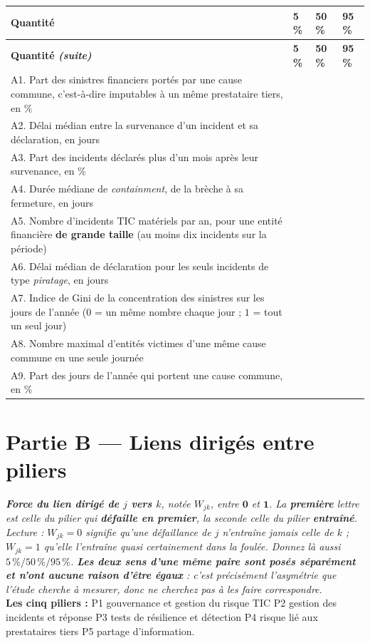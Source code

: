 \documentclass[11pt,a4paper]{article}
\begin{document}
\vspace{0.2cm}
\begin{longtable}{|p{9.6cm}|A|A|A|}
\hline
{}
\textbf{Quantité} & \textbf{5\,\%} & \textbf{50\,\%} & \textbf{95\,\%} \\ \hline
\endfirsthead
\hline
{}
\textbf{Quantité \emph{(suite)}} & \textbf{5\,\%} & \textbf{50\,\%} & \textbf{95\,\%} \\ \hline
\endhead
A1. Part des sinistres financiers portés par une cause commune, c'est-à-dire imputables à un
même prestataire tiers, en \% & & & \\ \hline
A2. Délai médian entre la survenance d'un incident et sa déclaration, en jours & & & \\ \hline
A3. Part des incidents déclarés plus d'un mois après leur survenance, en \% & & & \\ \hline
A4. Durée médiane de \emph{containment}, de la brèche à sa fermeture, en jours & & & \\ \hline
A5. Nombre d'incidents TIC matériels par an, pour une entité financière \textbf{de grande
taille} (au moins dix incidents sur la période) & & & \\ \hline
A6. Délai médian de déclaration pour les seuls incidents de type \emph{piratage}, en jours & & & \\ \hline
A7. Indice de Gini de la concentration des sinistres sur les jours de l'année
($0$ = un même nombre chaque jour ; $1$ = tout un seul jour) & & & \\ \hline
A8. Nombre maximal d'entités victimes d'une même cause commune en une seule journée & & & \\ \hline
A9. Part des jours de l'année qui portent une cause commune, en \% & & & \\ \hline
\end{longtable}

\section*{Partie B --- Liens dirigés entre piliers}
\footnotesize\emph{\textbf{Force du lien dirigé de $j$ vers $k$}, notée $W_{jk}$, entre
$\mathbf{0}$ et $\mathbf{1}$. La \textbf{première} lettre est celle du pilier qui
\textbf{défaille en premier}, la seconde celle du pilier \textbf{entraîné}. Lecture :
$W_{jk}=0$ signifie qu'une défaillance de $j$ n'entraîne \emph{jamais} celle de $k$ ;
$W_{jk}=1$ qu'elle l'entraîne \emph{quasi certainement} dans la foulée. Donnez là aussi
$5\,\% / 50\,\% / 95\,\%$. \textbf{Les deux sens d'une même paire sont posés séparément et
n'ont aucune raison d'être égaux} : c'est précisément l'asymétrie que l'étude cherche à
mesurer, donc ne cherchez pas à les faire correspondre.}\\[3pt]
\textbf{Les cinq piliers :} P1 gouvernance et gestion du risque TIC \textbullet{} P2 gestion
des incidents et réponse \textbullet{} P3 tests de résilience et détection \textbullet{}
P4 risque lié aux prestataires tiers \textbullet{} P5 partage d'information.
\normalsize
\end{document}

